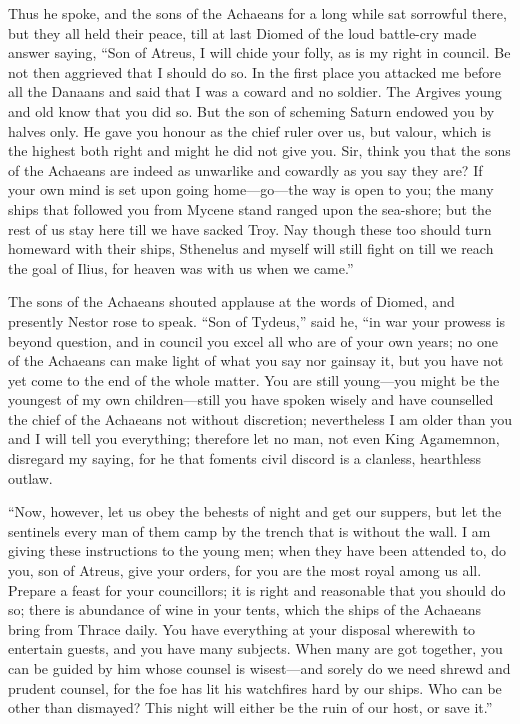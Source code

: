 Thus he spoke, and the sons of the Achaeans for a long while sat sorrowful
there, but they all held their peace, till at last Diomed of the loud
battle-cry made answer saying, “Son of Atreus, I will chide your folly, as
is my right in council. Be not then aggrieved that I should do so. In the
first place you attacked me before all the Danaans and said that I was a
coward and no soldier. The Argives young and old know that you did so. But
the son of scheming Saturn endowed you by halves only. He gave you honour
as the chief ruler over us, but valour, which is the highest both right
and might he did not give you. Sir, think you that the sons of the
Achaeans are indeed as unwarlike and cowardly as you say they are? If your
own mind is set upon going home—go—the way is open to you; the
many ships that followed you from Mycene stand ranged upon the sea-shore;
but the rest of us stay here till we have sacked Troy. Nay though these
too should turn homeward with their ships, Sthenelus and myself will still
fight on till we reach the goal of Ilius, for heaven was with us when we
came.”

The sons of the Achaeans shouted applause at the words of Diomed, and
presently Nestor rose to speak. “Son of Tydeus,” said he, “in war your
prowess is beyond question, and in council you excel all who are of your
own years; no one of the Achaeans can make light of what you say nor
gainsay it, but you have not yet come to the end of the whole matter. You
are still young—you might be the youngest of my own children—still
you have spoken wisely and have counselled the chief of the Achaeans not
without discretion; nevertheless I am older than you and I will tell you
everything; therefore let no man, not even King Agamemnon, disregard my
saying, for he that foments civil discord is a clanless, hearthless
outlaw.

“Now, however, let us obey the behests of night and get our suppers, but
let the sentinels every man of them camp by the trench that is without the
wall. I am giving these instructions to the young men; when they have been
attended to, do you, son of Atreus, give your orders, for you are the most
royal among us all. Prepare a feast for your councillors; it is right and
reasonable that you should do so; there is abundance of wine in your
tents, which the ships of the Achaeans bring from Thrace daily. You have
everything at your disposal wherewith to entertain guests, and you have
many subjects. When many are got together, you can be guided by him whose
counsel is wisest—and sorely do we need shrewd and prudent counsel,
for the foe has lit his watchfires hard by our ships. Who can be other
than dismayed? This night will either be the ruin of our host, or save
it.”

